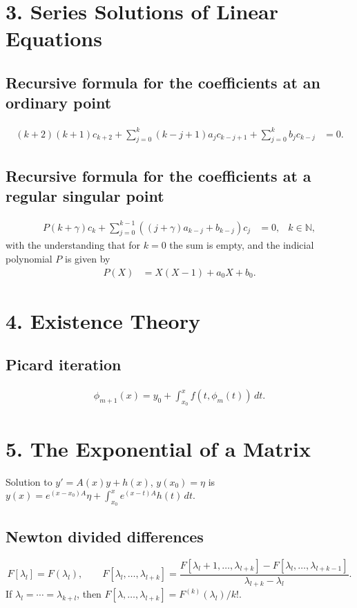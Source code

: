 \section*{3. Series Solutions of Linear Equations}

\subsection*{Recursive formula for the coefficients at an ordinary point}
\begin{align*}
    (k+2)(k+1)c_{k+2} + \sum_{j=0}^{k} (k-j+1)a_jc_{k-j+1} + \sum_{j=0}^{k}b_jc_{k-j} &= 0. 
\end{align*}

\subsection*{Recursive formula for the coefficients at a regular singular point}
\begin{align*}
P(k+\gamma)c_k + \sum_{j=0}^{k-1} ((j+\gamma)a_{k-j} + b_{k-j}) c_j &=0, &k\in \mathbb N,
\end{align*}
with the understanding that for $k=0$ the sum is empty, and the indicial 
polynomial $P$ is given by 
\begin{align*}
 P(X) &= X(X-1) + a_0X + b_0.
\end{align*}

\section*{4. Existence Theory}

\subsection*{Picard iteration}
\begin{align*}
  \phi_{m+1}(x) = y_0 + \int_{x_0}^x f(t,\phi_m(t))\, dt.
\end{align*}

\section*{5. The Exponential of a Matrix}

Solution to $y'=A(x)y+h(x)$, $y(x_0)=\eta$ is 
$y(x) = e^{(x-x_0)A}\eta + \int_{x_0}^x e^{(x-t)A}h(t)\, dt$.

\subsection*{Newton divided differences}
\[
    F[\lambda_l] = F(\lambda_l), \qquad
    F[\lambda_l,\ldots,\lambda_{l+k}] = 
    \frac{F[\lambda_l+1,\ldots,\lambda_{l+k}]-F[\lambda_l,\ldots,
    \lambda_{l+k-1}]}{\lambda_{l+k}-\lambda_l}.
\]
If $\lambda_l=\cdots = \lambda_{k+l}$, then 
$F[\lambda,\ldots,\lambda_{l+k}] = F^{(k)}(\lambda_l)/k!$.


